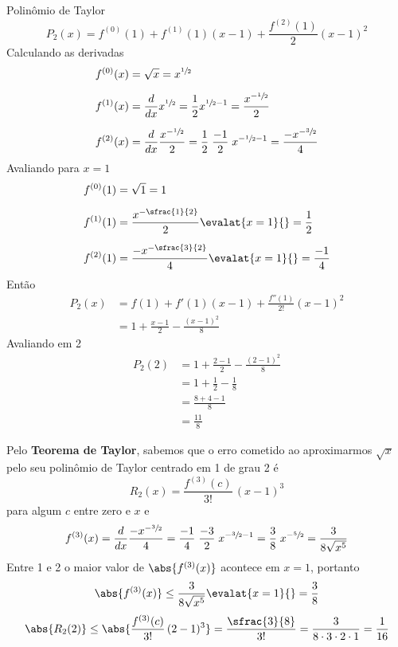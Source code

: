 \documentclass[a4paper,12pt,fleqn]{article}
\begin{document}
\begin{answer}
  Polinômio de Taylor
  \[
    P_2(x) = f^{(0)}(1) +  f^{(1)}(1)(x-1) +  \frac{f^{(2)}(1)}{2} (x-1)^2
  \]
  Calculando as derivadas
  \begin{align*}
    f^{(0)}(x)
    & = \sqrt{x}
      = x^{\sfrac{1}{2}} \\[2mm]
    f^{(1)}(x)
    & = \frac{d}{dx} x^{\sfrac{1}{2}}
      = \frac{1}{2} x^{\sfrac{1}{2}-1}
      = \frac{x^{-\sfrac{1}{2}}}{2} \\[2mm]
    f^{(2)}(x)
    & = \frac{d}{dx} \frac{x^{-\sfrac{1}{2}}}{2}
      = \frac{1}{2}\; \frac{-1}{2}\;  x^{-\sfrac{1}{2}-1}
      = \frac{-x^{-\sfrac{3}{2}}}{4}
  \end{align*}
  Avaliando para $x=1$
  \begin{align*}
    f^{(0)}(1) & = \sqrt{1} = 1 \\[2mm]
    f^{(1)}(1) & = \frac{x^{-\sfrac{1}{2}}}{2} \evalat{x=1}{} = \frac{1}{2}\\[2mm]
    f^{(2)}(1) & = \frac{-x^{-\sfrac{3}{2}}}{4} \evalat{x=1}{} = \frac{-1}{4}
  \end{align*}
  Então
  \begin{align*}
    P_2(x)
    & = f(1) + f'(1)(x-1) + \frac{f''(1)}{2!}(x-1)^2 \\
    & = 1 + \frac{x-1}{2} -\frac{(x-1)^2}{8}
  \end{align*}
  Avaliando em 2
  \begin{align*}
    P_2(2)
    & = 1 + \frac{2-1}{2} - \frac{(2-1)^2}{8} \\
    & = 1 + \frac{1}{2}   - \frac{1}{8} \\
    & = \frac{8+4-1}{8} \\
    & = \frac{11}{8}
  \end{align*}


  Pelo \textbf{Teorema de Taylor}, sabemos que o erro cometido ao aproximarmos
  $\sqrt{x}$ pelo seu polinômio de Taylor centrado em 1 de grau 2 é
  \[
    R_2(x) = \frac{f^{(3)}(c)}{3!} \, (x-1)^3
  \]
  para algum $c$ entre zero e $x$ e
  \[
    f^{(3)}(x)
    = \frac{d}{dx} \frac{-x^{-\sfrac{3}{2}}}{4}
    = \frac{-1}{4} \; \frac{-3}{2} \; x^{-\sfrac{3}{2}-1}
    = \frac{3}{8}\; x^{-\sfrac{5}{2}}
    = \frac{3}{8\sqrt{x^5}}
  \]
  Entre 1 e 2 o maior valor de \(\abs{f^{(3)}(x)}\) acontece em $x=1$, portanto
  \[
    \abs{f^{(3)}(x)}
    \leq \frac{3}{8\sqrt{x^5}} \evalat{x=1}{}
    = \frac{3}{8}
  \]
  \[
    \abs{R_2(2)}
    \leq \abs{\frac{f^{(3)}(c)}{3!} \, (2-1)^3}
    = \frac{\sfrac{3}{8}}{3!}
    = \frac{3}{8\cdot 3\cdot 2\cdot 1}
    = \frac{1}{16}
  \]
\end{answer}

\end{document}
